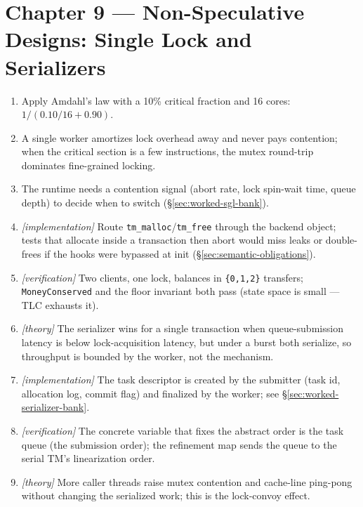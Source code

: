 \section*{Chapter 9 --- Non-Speculative Designs: Single Lock and Serializers}

\begin{enumerate}
    \item Apply Amdahl's law with a 10\% critical fraction and 16 cores:
          $1/(0.10/16 + 0.90)$.
    \item A single worker amortizes lock overhead away and never pays
          contention; when the critical section is a few instructions, the
          mutex round-trip dominates fine-grained locking.
    \item The runtime needs a contention signal (abort rate, lock
          spin-wait time, queue depth) to decide when to switch
          (\S\ref{sec:worked-sgl-bank}).
    \item \emph{[implementation]} Route \texttt{tm\_malloc}/\texttt{tm\_free}
          through the backend object; tests that allocate inside a
          transaction then abort would miss leaks or double-frees if the
          hooks were bypassed at init (\S\ref{sec:semantic-obligations}).
    \item \emph{[verification]} Two clients, one lock, balances in
          \texttt{\{0,1,2\}} transfers; \texttt{MoneyConserved} and the
          floor invariant both pass (state space is small --- TLC exhausts
          it).
    \item \emph{[theory]} The serializer wins for a single transaction when
          queue-submission latency is below lock-acquisition latency, but
          under a burst both serialize, so throughput is bounded by the
          worker, not the mechanism.
    \item \emph{[implementation]} The task descriptor is created by the
          submitter (task id, allocation log, commit flag) and finalized by
          the worker; see \S\ref{sec:worked-serializer-bank}.
    \item \emph{[verification]} The concrete variable that fixes the abstract
          order is the task queue (the submission order); the refinement
          map sends the queue to the serial TM's linearization order.
    \item \emph{[theory]} More caller threads raise mutex contention and
          cache-line ping-pong without changing the serialized work; this is
          the lock-convoy effect.
\end{enumerate}

